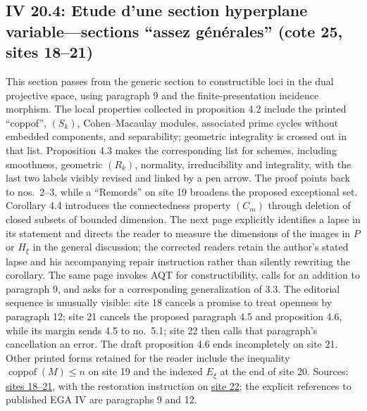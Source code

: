 \documentclass[10pt,a4paper]{article}
\begin{document}
\subsection*{IV 20.4: Etude d'une section hyperplane variable---sections ``assez générales'' (cote 25, sites 18--21)}
This section passes from the generic section to constructible loci in the dual projective space, using paragraph 9 and the finite-presentation incidence morphism. The local properties collected in proposition 4.2 include the printed ``coppof'', $(S_k)$, Cohen--Macaulay modules, associated prime cycles without embedded components, and separability; geometric integrality is crossed out in that list. Proposition 4.3 makes the corresponding list for schemes, including smoothness, geometric $(R_k)$, normality, irreducibility and integrality, with the last two labels visibly revised and linked by a pen arrow. The proof points back to nos.\ 2--3, while a ``Remords'' on site 19 broadens the proposed exceptional set. Corollary 4.4 introduces the connectedness property $(C_m)$ through deletion of closed subsets of bounded dimension. The next page explicitly identifies a lapse in its statement and directs the reader to measure the dimensions of the images in $P$ or $H_\xi$ in the general discussion; the corrected readers retain the author's stated lapse and his accompanying repair instruction rather than silently rewriting the corollary. The same page invokes AQT for constructibility, calls for an addition to paragraph 9, and asks for a corresponding generalization of 3.3. The editorial sequence is unusually visible: site 18 cancels a promise to treat openness by paragraph 12; site 21 cancels the proposed paragraph 4.5 and proposition 4.6, while its margin sends 4.5 to no.\ 5.1; site 22 then calls that paragraph's cancellation an error. The draft proposition 4.6 ends incompletely on site 21. Other printed forms retained for the reader include the inequality $\operatorname{coppof}(M)\leq n$ on site 19 and the indexed $E_\xi$ at the end of site 20. Sources: \href{https://grothendieck.umontpellier.fr/web/viewer.html?file=../25.pdf\#page=19}{sites 18--21}, with the restoration instruction on \href{https://grothendieck.umontpellier.fr/web/viewer.html?file=../25.pdf\#page=23}{site 22}; the explicit references to published EGA IV are paragraphs 9 and 12.
\par{}

\par{}
\end{document}
